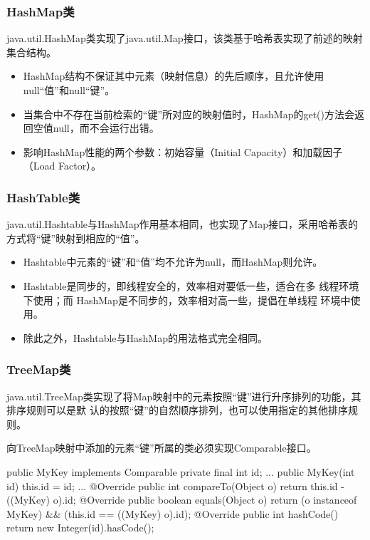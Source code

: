 \begin{frame}[fragile] %
  \frametitle{HashMap类}

  java.util.HashMap类实现了java.util.Map接口，该类基于{\hei\Blue 哈希表}实现了前述的映射集合结构。

  \begin{itemize}\kai
  \item HashMap结构不保证其中元素（映射信息）的先后顺序，且允许使用null“值”和null“键”。
  \item 当集合中不存在当前检索的“键”所对应的映射值时，HashMap的get()方法会返回空值null，而不会运行出错。
  \item 影响HashMap性能的两个参数：初始容量（Initial Capacity）和加载因子（Load Factor）。
  \end{itemize}
\end{frame}

\begin{frame}[fragile] %
  \frametitle{HashTable类}

  java.util.Hashtable与HashMap作用基本相同，也实现了Map接口，采用哈希表的方式将“键”映射到相应的“值”。


  \begin{itemize}\kai
  \item Hashtable中元素的“键”和“值”均不允许为null，而HashMap则允许。
  \item {\Red Hashtable是同步的，即线程安全的，效率相对要低一些，适合在多
      线程环境下使用；而 HashMap是不同步的，效率相对高一些，提倡在单线程
      环境中使用。}
  \item 除此之外，Hashtable与HashMap的用法格式完全相同。
  \end{itemize}
\end{frame}

\begin{frame}[fragile] %
  \frametitle{TreeMap类}

  java.util.TreeMap类实现了将Map映射中的元素按照“键”进行升序排列的功能，其排序规则可以是默
  认的按照“键”的自然顺序排列，也可以使用指定的其他排序规则。

  向TreeMap映射中添加的元素“键”所属的类必须实现Comparable接口。

  \begin{javaCode}
    public MyKey implements Comparable {
      private final int id;
      ...
      public MyKey(int id) {
        this.id = id;
      }
      ...
      @Override
      public int compareTo(Object o) {
        return this.id - ((MyKey) o).id;
      }
      @Override
      public boolean equals(Object o) {
        return (o instanceof MyKey) && (this.id == ((MyKey) o).id);
      }
      @Override
      public int hashCode() {
        return new Integer(id).hasCode();
      }
    }  
  \end{javaCode}
\end{frame}

